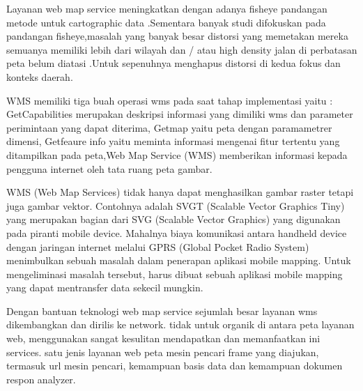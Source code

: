 Layanan web map service  meningkatkan dengan  adanya fisheye pandangan metode untuk cartographic data .Sementara banyak studi difokuskan pada pandangan fisheye,masalah yang banyak besar distorsi yang memetakan mereka semuanya memiliki lebih dari wilayah dan / atau high density jalan di perbatasan peta belum diatasi .Untuk sepenuhnya menghapus distorsi di kedua fokus dan konteks daerah.

WMS memiliki tiga buah operasi wms pada saat tahap implementasi yaitu : GetCapabilities merupakan deskripsi informasi yang dimiliki wms
dan parameter perimintaan yang dapat diterima, Getmap yaitu peta dengan paramametrer dimensi, Getfeaure info yaitu meminta informasi 
mengenai fitur tertentu yang ditampilkan pada peta,Web Map Service (WMS) memberikan informasi kepada pengguna internet oleh tata ruang peta gambar.

WMS (Web Map Services) tidak hanya dapat menghasilkan gambar raster tetapi juga gambar vektor. Contohnya  adalah SVGT (Scalable Vector Graphics Tiny) yang merupakan bagian dari SVG (Scalable Vector Graphics) yang digunakan pada piranti mobile device. Mahalnya biaya komunikasi antara handheld device dengan jaringan internet melalui GPRS (Global Pocket Radio System) menimbulkan sebuah masalah dalam penerapan aplikasi mobile mapping. Untuk mengeliminasi masalah tersebut, harus dibuat sebuah aplikasi mobile mapping yang dapat mentransfer data sekecil mungkin.

  Dengan bantuan teknologi web map service  sejumlah besar layanan wms dikembangkan dan dirilis ke network. tidak untuk organik di antara peta layanan web, menggunakan sangat kesulitan mendapatkan dan memanfaatkan ini services. satu jenis layanan web peta mesin pencari frame yang diajukan, termasuk url mesin pencari, kemampuan basis data dan kemampuan dokumen respon analyzer.
